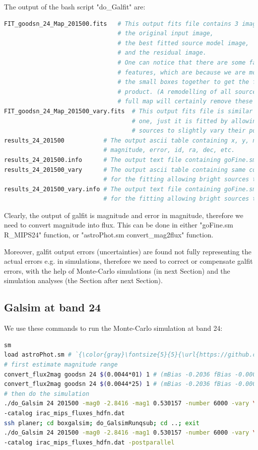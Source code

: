 \documentclass[11pt,a4paper]{article}
\begin{document}
The output of the bash script "do\_Galfit" are: 

\begin{lstlisting}[language=bash]
FIT_goodsn_24_Map_201500.fits	# This output fits file contains 3 images: 
								# the original input image, 
								# the best fitted source model image, 
								# and the residual image. 
								# One can notice that there are some faint tile 
								# features, which are because we are mosaicing all 
								# the small boxes together to get the final data 
								# product. (A remodelling of all sources over the 
								# full map will certainly remove these features.)
FIT_goodsn_24_Map_201500_vary.fits	# This output fits file is similar to the above 
									# one, just it is fitted by allowing bright 
									# sources to slightly vary their positions. 
results_24_201500			# The output ascii table containing x, y, noise (rms), 
							# magnitude, error, id, ra, dec, etc. 
results_24_201500.info		# The output text file containing goFine.sm parameter. 
results_24_201500_vary		# The output ascii table containing same columns as above, 
							# for the fitting allowing bright sources to vary positions. 
results_24_201500_vary.info	# The output text file containing goFine.sm parameters, 
							# for the fitting allowing bright sources to vary positions. 
\end{lstlisting}

Clearly, the output of galfit is magnitude and error in magnitude, 
therefore we need to convert magnitude into flux. 
This can be done in either "goFine.sm R\_MIPS24" function, 
or "astroPhot.sm convert\_mag2flux" function. 

Moreover, galfit output errors (uncertainties) are found not 
fully representing the actual errors e.g. in simulations, 
therefore we need to correct or compensate galfit errors, 
with the help of Monte-Carlo simulations (in next Section) and the simulation analyses (the Section after next Section). 




\subsection{Galsim at band 24}

We use these commands to run the Monte-Carlo simulation at band 24:

\begin{lstlisting}[language=bash]
sm
load astroPhot.sm # `{\color{gray}\fontsize{5}{5}{\url{https://github.com/1054/DeepFields.SuperDeblending/blob/master/Softwares/Supermongo_macro/astroPhot.sm}}}`
# first estimate magnitude range
convert_flux2mag goodsn 24 $(0.0044*01) 1 # (mBias -0.2036 fBias -0.000553)
convert_flux2mag goodsn 24 $(0.0044*25) 1 # (mBias -0.2036 fBias -0.000553)
# then do the simulation
./do_Galsim 24 201500 -mag0 -2.8416 -mag1 0.530157 -number 6000 -vary \
-catalog irac_mips_fluxes_hdfn.dat
ssh planer; cd boxgalsim; do_GalsimRunqsub; cd ..; exit
./do_Galsim 24 201500 -mag0 -2.8416 -mag1 0.530157 -number 6000 -vary \
-catalog irac_mips_fluxes_hdfn.dat -postparallel
\end{lstlisting}
\end{document}
